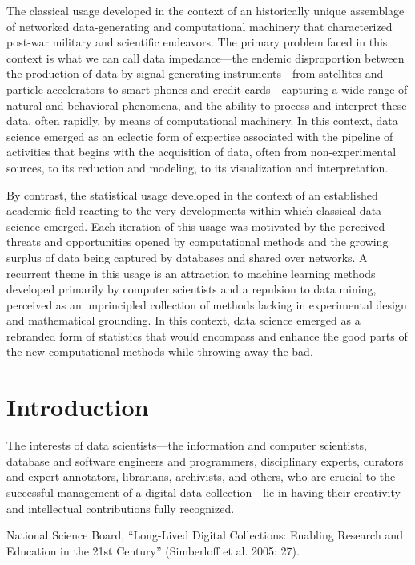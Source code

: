 \documentclass[
  letterpaper,
]{report}
\begin{document}
The classical usage developed in the context of an historically unique
assemblage of networked data-generating and computational machinery that
characterized post-war military and scientific endeavors. The primary
problem faced in this context is what we can call data impedance---the
endemic disproportion between the production of data by
signal-generating instruments---from satellites and particle
accelerators to smart phones and credit cards---capturing a wide range
of natural and behavioral phenomena, and the ability to process and
interpret these data, often rapidly, by means of computational
machinery. In this context, data science emerged as an eclectic form of
expertise associated with the pipeline of activities that begins with
the acquisition of data, often from non-experimental sources, to its
reduction and modeling, to its visualization and interpretation.

By contrast, the statistical usage developed in the context of an
established academic field reacting to the very developments within
which classical data science emerged. Each iteration of this usage was
motivated by the perceived threats and opportunities opened by
computational methods and the growing surplus of data being captured by
databases and shared over networks. A recurrent theme in this usage is
an attraction to machine learning methods developed primarily by
computer scientists and a repulsion to data mining, perceived as an
unprincipled collection of methods lacking in experimental design and
mathematical grounding. In this context, data science emerged as a
rebranded form of statistics that would encompass and enhance the good
parts of the new computational methods while throwing away the bad.

\hypertarget{introduction}{%
\chapter{Introduction}\label{introduction}}

The interests of data scientists---the information and computer
scientists, database and software engineers and programmers,
disciplinary experts, curators and expert annotators, librarians,
archivists, and others, who are crucial to the successful management of
a digital data collection---lie in having their creativity and
intellectual contributions fully recognized.

National Science Board, ``Long-Lived Digital Collections: Enabling
Research and Education in the 21st Century'' (Simberloff et al. 2005:
27).
\end{document}
